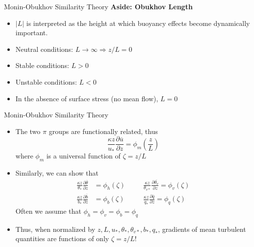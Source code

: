 \begin{frame}{Monin-Obukhov Similarity Theory}
\textbf{Aside: Obukhov Length}
	\begin{itemize}
		\item $|L|$ is interpreted as the height at which buoyancy effects become dynamically important.
		\item Neutral conditions: $L\rightarrow \infty \Rightarrow z/L = 0$
		\item Stable conditions: $L>0$
		\item Unstable conditions: $L<0$
		\item In the absence of surface stress (no mean flow), $L=0$
	\end{itemize}
\end{frame}
\begin{frame}{Monin-Obukhov Similarity Theory}
	\begin{itemize}
		\item The two $\pi$ groups are functionally related, thus
		$$\frac{\kappa z}{u_*} \frac{\partial \overline{u}}{\partial z} = \phi_m \left(\frac{z}{L} \right)$$
		where $\phi_m$ is a universal function of $\zeta = z/L$
		\item Similarly, we can show that
		\begin{align*}
			\frac{\kappa z}{\theta_*} \frac{\partial \overline{\theta}}{\partial z} &= \phi_h \left(\zeta \right)
			& \quad & \frac{\kappa z}{\theta_{v*}} \frac{\partial \overline{\theta_v}}{\partial z} = \phi_v \left(\zeta \right)\\ \frac{\kappa z}{b_*} \frac{\partial \overline{b}}{\partial z} &= \phi_b \left(\zeta \right) 
			& \quad & \frac{\kappa z}{q_{*}} \frac{\partial \overline{q}}{\partial z} = \phi_q \left(\zeta \right)
		\end{align*}
	Often we assume that $\phi_h = \phi_v = \phi_b = \phi_q$ 
	\item Thus, when normalized by $z,L,u_*, \theta_*, \theta_{v*}, b_*, q_*$, gradients of mean turbulent quantities are functions of only $\zeta=z/L$!
	\end{itemize}
\end{frame}
